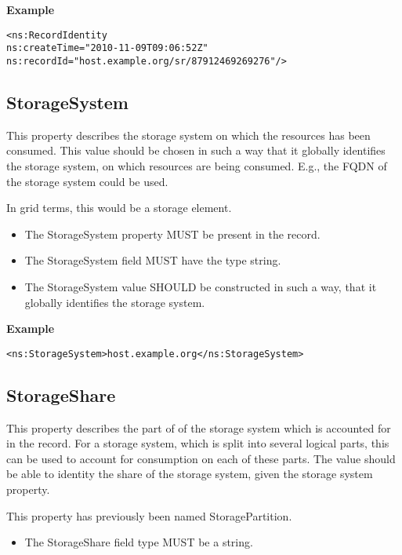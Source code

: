 {\bf Example}
\begin{verbatim}
<ns:RecordIdentity
ns:createTime="2010-11-09T09:06:52Z"
ns:recordId="host.example.org/sr/87912469269276"/>
\end{verbatim}


\subsection{StorageSystem}

This property describes the storage system on which the resources has been
consumed. This value should be chosen in such a way that it globally identifies
the storage system, on which resources are being consumed. E.g., the FQDN of
the storage system could be used.

In grid terms, this would be a storage element.

\begin{itemize}
\item The StorageSystem property MUST be present in the record.
\item The StorageSystem field MUST have the type string.
\item The StorageSystem value SHOULD be constructed in such a way, that it
    globally identifies the storage system.
\end{itemize}

{\bf Example}
\begin{verbatim}
<ns:StorageSystem>host.example.org</ns:StorageSystem>
\end{verbatim}


\subsection{StorageShare}

This property describes the part of of the storage system which is accounted
for in the record. For a storage system, which is split into several logical
parts, this can be used to account for consumption on each of these parts.
The value should be able to identity the share of the storage system, given
the storage system property.

This property has previously been named StoragePartition.

\begin{itemize}
\item The StorageShare field type MUST be a string.
\end{itemize}

